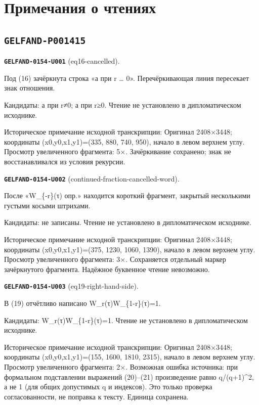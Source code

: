 \section*{Примечания о чтениях}
\subsection*{\texttt{GELFAND-P001415}}
\par\noindent\leavevmode{}\label{GELFAND-0154-U001}\textbf{\texttt{GELFAND-0154-U001}} (eq16-cancelled).\nopagebreak[4]\par
Под (16) зачёркнута строка «а при r … 0». Перечёркивающая линия пересекает знак отношения.\par
Кандидаты: а при r≠0; а при r≥0. Чтение не установлено в дипломатическом исходнике.\par
Историческое примечание исходной транскрипции: Оригинал 2408×3448; координаты (x0,y0,x1,y1)=(335, 880, 740, 950), начало в левом верхнем углу. Просмотр увеличенного фрагмента: 5×. Зачёркивание сохранено; знак не восстанавливался из условия рекурсии.\par\medskip
\par\noindent\leavevmode{}\label{GELFAND-0154-U002}\textbf{\texttt{GELFAND-0154-U002}} (continued-fraction-cancelled-word).\nopagebreak[4]\par
После «W\_\{-r\}(τ) опр.» находится короткий фрагмент, закрытый несколькими густыми косыми штрихами.\par
Кандидаты: не записаны. Чтение не установлено в дипломатическом исходнике.\par
Историческое примечание исходной транскрипции: Оригинал 2408×3448; координаты (x0,y0,x1,y1)=(375, 1230, 1060, 1390), начало в левом верхнем углу. Просмотр увеличенного фрагмента: 3×. Сохраняется отдельный маркер зачёркнутого фрагмента. Надёжное буквенное чтение невозможно.\par\medskip
\par\noindent\leavevmode{}\label{GELFAND-0154-U003}\textbf{\texttt{GELFAND-0154-U003}} (eq19-right-hand-side).\nopagebreak[4]\par
В (19) отчётливо написано W\_r(τ)W\_\{1-r\}(τ)=1.\par
Кандидаты: W\_r(τ)W\_\{1-r\}(τ)=1. Чтение не установлено в дипломатическом исходнике.\par
Историческое примечание исходной транскрипции: Оригинал 2408×3448; координаты (x0,y0,x1,y1)=(155, 1600, 1810, 2315), начало в левом верхнем углу. Просмотр увеличенного фрагмента: 2×. Возможная ошибка источника: при формальном подставлении выражений (20)–(21) произведение равно q/(q+1)\textasciicircum{}2, а не 1 (для общих допустимых q и индексов). Это только проверка согласованности, не поправка к тексту. Единица сохранена.\par\medskip
